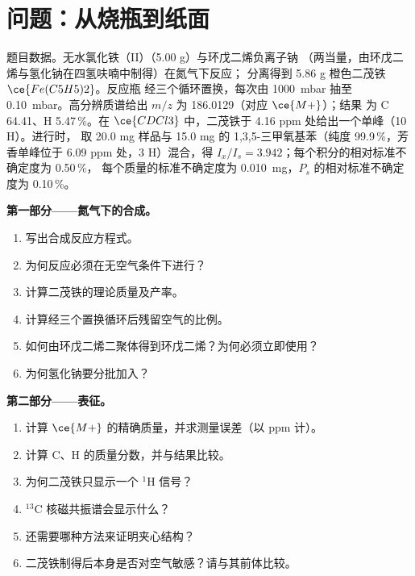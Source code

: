 \section{问题：从烧瓶到纸面}

\begin{problem}
\label{pb:b3:lab-techniques-3:1}
题目数据。无水氯化铁（II）（5.00 g）与环戊二烯负离子钠
（两当量，由环戊二烯与氢化钠在四氢呋喃中制得）在氮气下反应；
分离得到 5.86 g 橙色二茂铁 $\ce{Fe(C5H5)2}$。反应瓶
经三个循环置换，每次由 \qty{1000}{mbar} 抽至 \qty{0.10}{mbar}。高分辨质谱给出 $m/z$ 为 186.0129（对应 $\ce{M+}$）；结果
为 C 64.41、H 5.47\,\%。在 $\ce{CDCl3}$ 中，二茂铁于 4.16 ppm 处给出一个单峰（10 H）。进行时，
取 20.0 mg 样品与 15.0 mg 的 1,3,5-三甲氧基苯（纯度 99.9\,\%，芳香单峰位于
6.09 ppm 处，3 H）混合，得 $I_x/I_s = 3.942$；每个积分的相对标准不确定度为 0.50\,\%，
每个质量的标准不确定度为 \qty{0.010}{mg}，$P_s$ 的相对标准不确定度为 0.10\,\%。

\medskip\noindent\textbf{第一部分——氮气下的合成。}
\begin{enumerate}
  \item 写出合成反应方程式。
  \item 为何反应必须在无空气条件下进行？
  \item 计算二茂铁的理论质量及产率。
  \item 计算经三个置换循环后残留空气的比例。
  \item 如何由环戊二烯二聚体得到环戊二烯？为何必须立即使用？
  \item 为何氢化钠要分批加入？
\end{enumerate}

\medskip\noindent\textbf{第二部分——表征。}
\begin{enumerate}[resume]
  \item 计算 $\ce{M+}$ 的精确质量，并求测量误差（以 ppm 计）。
  \item 计算 C、H 的质量分数，并与结果比较。
  \item 为何二茂铁只显示一个 $^1$H 信号？
  \item $^{13}$C 核磁共振谱会显示什么？
  \item 还需要哪种方法来证明夹心结构？
  \item 二茂铁制得后本身是否对空气敏感？请与其前体比较。
\end{enumerate}


\end{problem}
